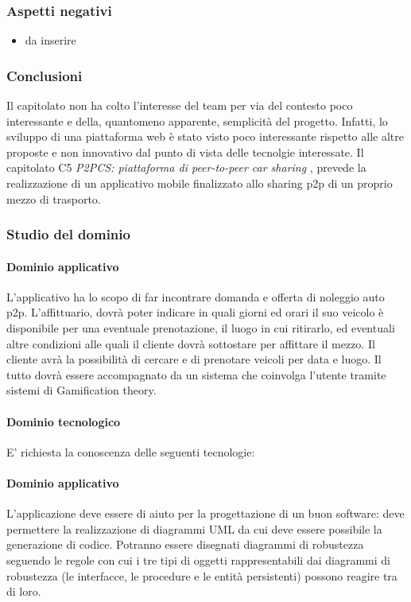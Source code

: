 		\subsubsection{Aspetti negativi}
		\begin{itemize}
			\item da inserire
		\end{itemize}
		\subsubsection{Conclusioni}
		Il capitolato non ha colto l'interesse del team per via del contesto poco interessante e della, quantomeno apparente, semplicità del progetto. Infatti, lo sviluppo di una piattaforma web è stato visto poco interessante rispetto alle altre proposte e non innovativo dal punto di vista delle tecnolgie interessate. 
		Il capitolato C5 \emph{P2PCS:  piattaforma di peer-to-peer car sharing} , prevede la realizzazione di un
applicativo mobile finalizzato allo sharing p2p di un proprio mezzo di trasporto.

		\subsubsection{Studio del dominio}
			\paragraph{Dominio applicativo} \Spazio
			L'applicativo ha lo scopo di far incontrare domanda e offerta di noleggio auto p2p.
L'affittuario, dovrà poter indicare in quali giorni ed orari il suo veicolo è disponibile
per una eventuale prenotazione, il luogo in cui ritirarlo, ed eventuali altre
condizioni alle quali il cliente dovrà sottostare per affittare il mezzo.
Il cliente avrà la possibilità di cercare e di prenotare veicoli per data e luogo.
Il tutto dovrà essere accompagnato da un sistema che coinvolga l'utente tramite sistemi di
Gamification theory.
			\paragraph{Dominio tecnologico} \Spazio
			E' richiesta la conoscenza delle seguenti tecnologie:
			\paragraph{Dominio applicativo} 
			L'applicazione deve essere di aiuto per la progettazione di un buon software: deve permettere la realizzazione di diagrammi UML da cui deve essere possibile la generazione di codice. Potranno essere disegnati diagrammi di robustezza seguendo le regole con cui i tre tipi di oggetti rappresentabili dai diagrammi di robustezza (le interfacce, le procedure e le entità persistenti) possono reagire tra di loro.
